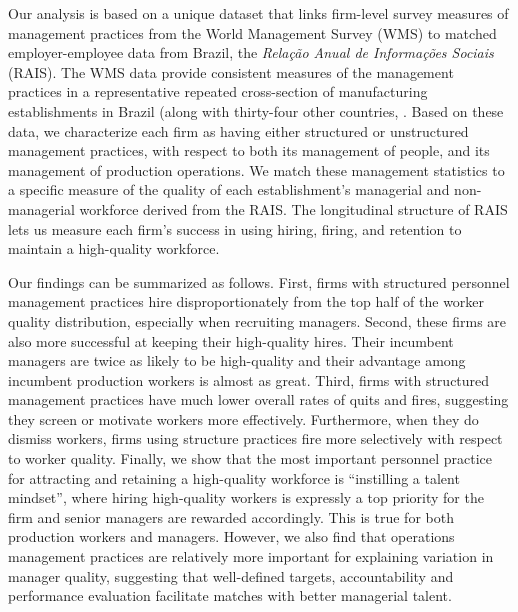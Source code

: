 Our analysis is based on a unique dataset that links firm-level survey measures of management practices from the World Management Survey (WMS) to matched employer-employee data from Brazil, the \emph{Rela\c{c}\~{a}o Anual de Informa\c{c}\~{o}es Sociais} (RAIS). The WMS data provide consistent measures of the management practices in a representative repeated cross-section of manufacturing establishments in Brazil (along with thirty-four other countries, \citet{bloom_qje2007}. 
Based on these data, we characterize each firm as having either structured or unstructured management practices, with respect to both its management of people, and its management of production operations. We match these management statistics to a specific measure of the quality of each establishment's managerial and non-managerial workforce derived from the RAIS. The longitudinal structure of RAIS lets us measure each firm's success in using hiring, firing, and retention to maintain a high-quality workforce.

Our findings can be summarized as follows. First, firms with structured personnel management practices hire disproportionately from the top half of the worker quality distribution, especially when recruiting managers. Second, these firms are also more successful at keeping their high-quality hires. Their incumbent managers are twice as likely to be high-quality and their advantage among incumbent production workers is almost as great. Third, firms with structured management practices have much lower overall rates of quits and fires, suggesting they screen or motivate workers more effectively. Furthermore, when they do dismiss workers, firms using structure practices fire more selectively with respect to worker quality.  Finally, we show that the most important personnel practice for attracting and retaining a high-quality workforce is ``instilling a talent mindset'', where hiring high-quality workers is expressly a top priority for the firm and senior managers are rewarded accordingly.  This is true for both production workers and managers. However, we also find that operations management practices are relatively more important for explaining variation in manager quality, suggesting that well-defined targets, accountability and performance evaluation facilitate matches with better managerial talent. 

